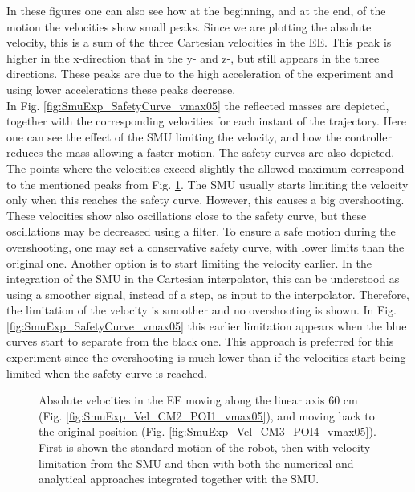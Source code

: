 In these figures one can also see how at the beginning, and at the end, of the motion the velocities show small peaks. Since we are plotting the absolute velocity, this is a sum of the three Cartesian velocities in the EE. This peak is higher in the x-direction that in the y- and z-, but still appears in the three directions. These peaks are due to the high acceleration of the experiment and using lower accelerations these peaks decrease.  \\ 
In Fig. \ref{fig:SmuExp_SafetyCurve_vmax05} the reflected masses are depicted, together with the corresponding velocities for each instant of the trajectory. Here one can see the effect of the SMU limiting the velocity, and how the controller reduces the mass allowing a faster motion. The safety curves are also depicted.
%
The points where the velocities exceed slightly the allowed maximum correspond to the mentioned peaks from Fig. \ref{fig:SmuExp_Vel_vmax05}. The SMU usually starts limiting the velocity only when this reaches the safety curve.  However, this causes a big overshooting. These velocities show also oscillations close to the safety curve, but these oscillations may be decreased using a filter. To ensure a safe motion  during the overshooting, one may set a conservative safety curve, with lower limits than the original one. Another option is to start limiting the velocity earlier. In the integration of the SMU in the Cartesian interpolator, this can be understood as using a smoother signal, instead of a step, as input to the interpolator.    Therefore, the limitation of the velocity is smoother and no overshooting is shown. In Fig. \ref{fig:SmuExp_SafetyCurve_vmax05} this earlier limitation appears when the blue curves start to separate from the black one. This approach is preferred for this experiment since the overshooting is much lower than if the velocities start being limited when the safety curve is reached. 

\begin{figure}[htp!]
	\centering	
	 	 	
		\caption{Absolute velocities in the EE moving along the linear axis 60 cm (Fig. \ref{fig:SmuExp_Vel_CM2_POI1_vmax05}), and moving back to the original position (Fig. \ref{fig:SmuExp_Vel_CM3_POI4_vmax05}). First is shown the standard motion of the robot, then with velocity limitation from the SMU and then with both the numerical and analytical approaches integrated together with the SMU.}
	\label{fig:SmuExp_Vel_vmax05}
\end{figure}




